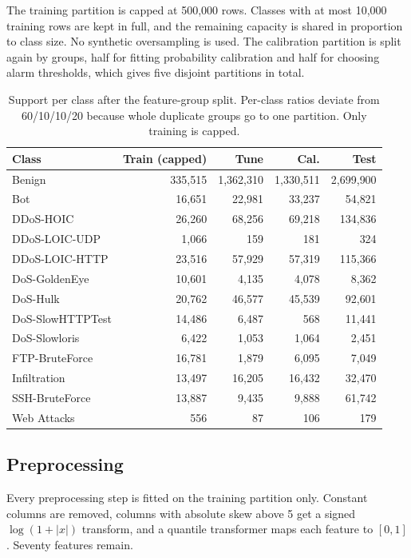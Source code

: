 \documentclass[conference]{IEEEtran}
\begin{document}
The training partition is capped at 500{,}000 rows. Classes with at most 10{,}000 training rows are kept in full, and the remaining capacity is shared in proportion to class size. No synthetic oversampling is used. The calibration partition is split again by groups, half for fitting probability calibration and half for choosing alarm thresholds, which gives five disjoint partitions in total.

\begin{table}[t]
\centering
\caption{Support per class after the feature-group split. Per-class ratios deviate from 60/10/10/20 because whole duplicate groups go to one partition. Only training is capped.}
\label{tab:data}
\setlength{\tabcolsep}{3pt}
\begin{tabular}{lrrrr}
\toprule
Class & Train (capped) & Tune & Cal. & Test \\
\midrule
Benign & 335{,}515 & 1{,}362{,}310 & 1{,}330{,}511 & 2{,}699{,}900 \\
Bot & 16{,}651 & 22{,}981 & 33{,}237 & 54{,}821 \\
DDoS-HOIC & 26{,}260 & 68{,}256 & 69{,}218 & 134{,}836 \\
DDoS-LOIC-UDP & 1{,}066 & 159 & 181 & 324 \\
DDoS-LOIC-HTTP & 23{,}516 & 57{,}929 & 57{,}319 & 115{,}366 \\
DoS-GoldenEye & 10{,}601 & 4{,}135 & 4{,}078 & 8{,}362 \\
DoS-Hulk & 20{,}762 & 46{,}577 & 45{,}539 & 92{,}601 \\
DoS-SlowHTTPTest & 14{,}486 & 6{,}487 & 568 & 11{,}441 \\
DoS-Slowloris & 6{,}422 & 1{,}053 & 1{,}064 & 2{,}451 \\
FTP-BruteForce & 16{,}781 & 1{,}879 & 6{,}095 & 7{,}049 \\
Infiltration & 13{,}497 & 16{,}205 & 16{,}432 & 32{,}470 \\
SSH-BruteForce & 13{,}887 & 9{,}435 & 9{,}888 & 61{,}742 \\
Web Attacks & 556 & 87 & 106 & 179 \\
\bottomrule
\end{tabular}
\end{table}

\subsection{Preprocessing}

Every preprocessing step is fitted on the training partition only. Constant columns are removed, columns with absolute skew above 5 get a signed $\log(1+|x|)$ transform, and a quantile transformer maps each feature to $[0,1]$. Seventy features remain.
\end{document}
